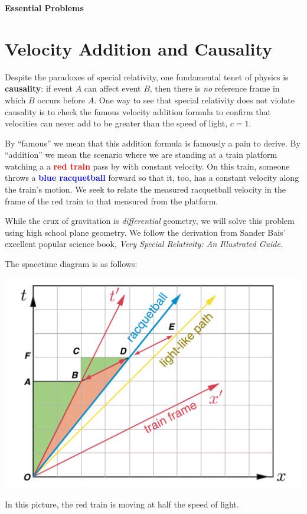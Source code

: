 \documentclass[12pt]{article}
\numberwithin{equation}{section}    %
\begin{document}
\vspace{2em}
{\Large\textbf{\textsf{Essential Problems}}}

\section{Velocity Addition and Causality}

Despite the paradoxes of special relativity, one fundamental tenet of physics is \textbf{causality}: if event $A$ can affect event $B$, then there is \emph{no} reference frame in which $B$ occurs before $A$. One way to see that special relativity does not violate causality is to check the famous velocity addition formula to confirm that velocities can never add to be greater than the speed of light, $c=1$. 

By ``famous'' we mean that this addition formula is famously a pain to derive. By ``addition'' we mean the scenario where we are standing at a train platform watching a a \textcolor{red}{\textbf{red train}} pass by with constant velocity. On this train, someone throws a \textcolor{blue}{\textbf{blue racquetball}} forward so that it, too, has a constant velocity along the train's motion. We seek to relate the measured racquetball velocity in the frame of the red train to that measured from the platform.


While the crux of gravitation is \emph{differential} geometry, we will solve this problem using high school plane geometry. We follow the derivation from Sander Bais' excellent popular science book, \emph{Very Special Relativity: An Illustrated Guide}. 

The spacetime diagram is as follows:
\begin{center}
	\includegraphics[width=.55\textwidth]{FromBais}
\end{center}
In this picture, the red train is moving at half the speed of light. 
\end{document}
